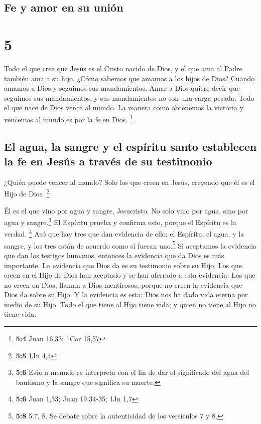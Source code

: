 \hypertarget{fe-y-amor-en-su-uniuxf3n}{%
\subsection{Fe y amor en su unión}\label{fe-y-amor-en-su-uniuxf3n}}

\hypertarget{section-4}{%
\section{5}\label{section-4}}

 Todo el que cree que Jesús es el Cristo nacido de Dios, y
el que ama al Padre también ama a su hijo.  ¿Cómo sabemos
que amamos a los hijos de Dios? Cuando amamos a Dios y seguimos sus
mandamientos.  Amar a Dios quiere decir que seguimos sus
mandamientos, y sus mandamientos no son una carga pesada. 
Todo el que nace de Dios vence al mundo. La manera como obtenemos la
victoria y vencemos al mundo es por la fe en Dios. \footnote{\textbf{5:4}
  Juan 16,33; 1Cor 15,57}

\hypertarget{el-agua-la-sangre-y-el-espuxedritu-santo-establecen-la-fe-en-jesuxfas-a-travuxe9s-de-su-testimonio}{%
\subsection{El agua, la sangre y el espíritu santo establecen la fe en
Jesús a través de su
testimonio}\label{el-agua-la-sangre-y-el-espuxedritu-santo-establecen-la-fe-en-jesuxfas-a-travuxe9s-de-su-testimonio}}

 ¿Quién puede vencer al mundo? Solo los que creen en
Jesús, creyendo que él es el Hijo de Dios. \footnote{\textbf{5:5} 1Jn
  4,4}

 Él es el que vino por agua y sangre, Jesucristo. No solo
vino por agua, sino por agua y sangre.\footnote{\textbf{5:6} Esto a
  menudo se interpreta con el fin de dar el significado del agua del
  bautismo y la sangre que significa su muerte.} El Espíritu prueba y
confirma esto, porque el Espíritu es la verdad. \footnote{\textbf{5:6}
  Juan 1,33; Juan 19,34-35; 1Jn 1,7}  Asó que hay tres que
dan evidencia de ello:  el Espíritu, el agua, y la sangre,
y los tres están de acuerdo como si fueran uno.\footnote{\textbf{5:8}
  5:7, 8. Se debate sobre la autenticidad de los versículos 7 y 8.}
 Si aceptamos la evidencia que dan los testigos humanos,
entonces la evidencia que da Dios es más importante. La evidencia que
Dios da es su testimonio sobre su Hijo.  Los que creen en
el Hijo de Dios han aceptado y se han aferrado a esta evidencia. Los que
no creen en Dios, llaman a Dios mentirosos, porque no creen la evidencia
que Dios da sobre su Hijo.  Y la evidencia es esta: Dios
nos ha dado vida eterna por medio de su Hijo.  Todo el
que tiene al Hijo tiene vida; y quien no tiene al Hijo no tiene vida.

